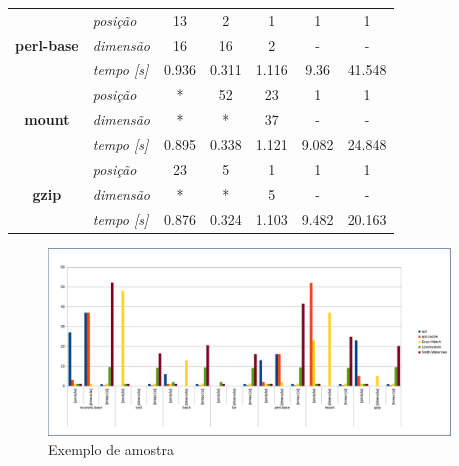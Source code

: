 \begin{table}[htbp]
{\begin{tabular}{|c|l|c|c|c|c|c|}
\multicolumn{ 1}{|c|}{} & \textit{posição} & 13 & 2 & 1 & 1 & 1 \\ \cline{ 2- 7}
\multicolumn{ 1}{|c|}{\textbf{perl-base}} & \textit{dimensão} & 16 & 16 & 2 & - & - \\ \cline{ 2- 7}
\multicolumn{ 1}{|c|}{} & \textit{tempo [s]} & 0.936 & 0.311 & 1.116 & 9.36 & 41.548 \\ \hline
\multicolumn{ 1}{|c|}{} & \textit{posição} & * & 52 & 23 & 1 & 1 \\ \cline{ 2- 7}
\multicolumn{ 1}{|c|}{\textbf{mount}} & \textit{dimensão} & * & * & 37 & - & - \\ \cline{ 2- 7}
\multicolumn{ 1}{|c|}{} & \textit{tempo [s]} & 0.895 & 0.338 & 1.121 & 9.082 & 24.848 \\ \hline
\multicolumn{ 1}{|c|}{} & \textit{posição} & 23 & 5 & 1 & 1 & 1 \\ \cline{ 2- 7}
\multicolumn{ 1}{|c|}{\textbf{gzip}} & \textit{dimensão} & * & * & 5 & - & - \\ \cline{ 2- 7}
\multicolumn{ 1}{|c|}{} & \textit{tempo [s]} & 0.876 & 0.324 & 1.103 & 9.482 & 20.163 \\ \hline
\end{tabular}
}
\label{tab:comparacao}
\end{table}

\begin{figure}[h]
  \centering
	\includegraphics[width=0.95\textwidth]{figuras/grafico}
  \caption{Exemplo de amostra}
  \label{fig:figuras_grafico}
\end{figure}

\lipsum[1]
